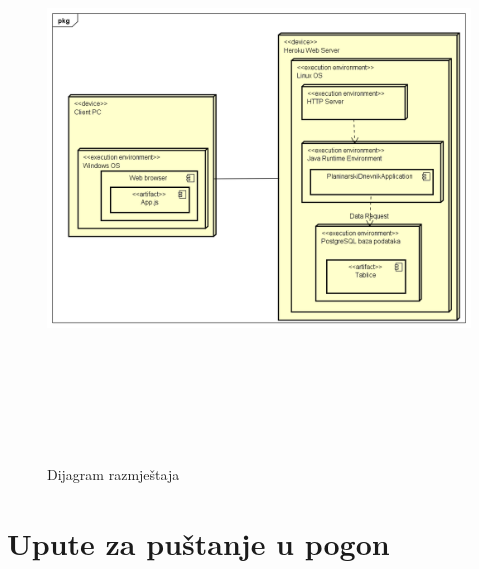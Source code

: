 			\begin{figure}[H]
				\includegraphics[width=160mm, height=155mm]{dijagrami/deployment diagram.png} %
				\centering
				\caption{Dijagram razmještaja}
				\label{fig:dijagramdeployment}
			\end{figure}
			\eject 
		
		\section{Upute za puštanje u pogon}
		
